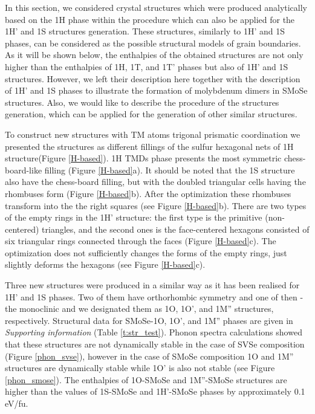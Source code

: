 \documentclass[a4paperm]{article}
\begin{document}
In this section, we considered crystal structures  which were produced analytically based on the 1H phase within the procedure which can  also be applied for the 1H' and 1S structures generation.
These structures, similarly to 1H' and 1S phases, can be considered as the possible structural models of grain boundaries.
As it will be shown below, the enthalpies of the obtained structures are not only higher than the enthalpies of 1H, 1T, and 1T' phases but also of 1H' and 1S structures.
However, we left their description here together with the description of 1H' and 1S phases to illustrate the formation of molybdenum dimers in SMoSe structures. 
Also, we would like to describe the procedure of the structures generation, which can be applied for the generation of other similar structures.

To construct new structures with TM atoms trigonal prismatic coordination we presented the structures as different fillings of the sulfur hexagonal nets of 1H structure(Figure \ref{H-based}).
1H TMDs phase presents the most symmetric chess-board-like filling (Figure \ref{H-based}a).
It should be noted that the 1S structure also have the chess-board filling, but with the doubled triangular cells having the rhombuses form (Figure \ref{H-based}b).
After the optimization these rhombuses transform into the the right squares (see Figure \ref{H-based}b).
There are two types of the empty rings in the 1H' structure: the first type is the primitive (non-centered) triangles, and the second ones is the face-centered hexagons consisted of six triangular rings connected through the faces (Figure \ref{H-based}c).
The optimization does not sufficiently changes the forms of the empty rings, just slightly deforms the hexagons (see Figure \ref{H-based}c).

Three new structures were produced in a similar way as it has been realised for 1H' and 1S phases. Two of them have orthorhombic symmetry and one of then - the monoclinic and we designated them as 1O, 1O', and 1M'' structures, respectively.
Structural data for SMoSe-1O, 1O', and 1M'' phases are given in {\it Supporting information} (Table \ref{t:str_test}).
Phonon spectra calculations showed that these structures are not dynamically stable in the case of SVSe composition (Figure \ref{phon_svse}), however in the case of SMoSe composition 1O and 1M'' structures are dynamically stable while 1O' is also not stable (see Figure \ref{phon_smose}).
The enthalpies of 1O-SMoSe and 1M''-SMoSe structures are higher than the values of 1S-SMoSe and 1H'-SMoSe phases by approximately 0.1 eV/fu.
\end{document}
